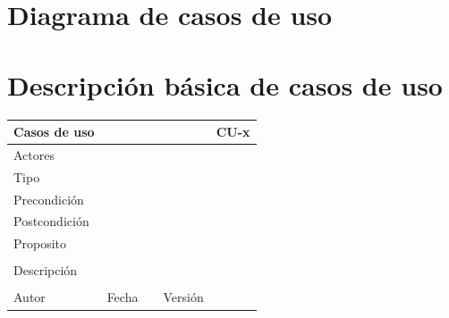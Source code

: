 \documentclass{article}
\begin{document}
\section{Diagrama de casos de uso}
\section{Descripción básica de casos de uso}


\begin{table}[h]
\begin{tabular}{|l|l|l|l|l|l|}
\hline
\multicolumn{2}{|p{2cm}|}{Casos de uso}  & \multicolumn{3}{p{7cm}|}{} & CU-x \\
\hline
\multicolumn{2}{|p{2cm}|}{Actores}       & \multicolumn{4}{p{8cm}|}{}        \\
\hline
\multicolumn{2}{|p{2cm}|}{Tipo}          & \multicolumn{4}{p{8cm}|}{}        \\
\hline
\multicolumn{2}{|p{2cm}|}{Precondición}  & \multicolumn{4}{p{8cm}|}{}        \\
\hline
\multicolumn{2}{|p{2cm}|}{Postcondición} & \multicolumn{4}{p{8cm}|}{}        \\
\hline
\multicolumn{6}{|p{10cm}|}{Proposito}                                   \\
\hline
\multicolumn{6}{|p{10cm}|}{}                                            \\
\hline
\multicolumn{6}{|p{10cm}|}{Descripción}                                 \\
\hline
\multicolumn{6}{|p{10cm}|}{}                                            \\
\hline
Autor              &              & Fecha    &     &   Versión  &\\     
\hline
\end{tabular}
\end{table}
\end{document}
